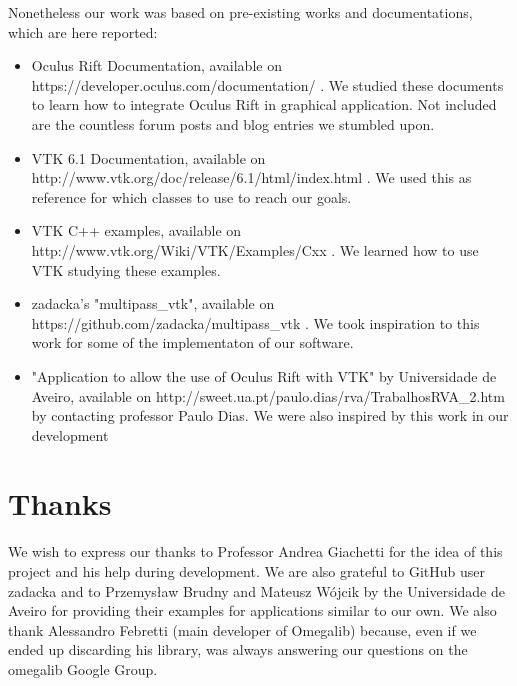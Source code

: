 \documentclass[11pt]{article} %
\begin{document}
Nonetheless our work was based on pre-existing works and documentations, which are here reported:
\begin{itemize}
\item Oculus Rift Documentation, available on https://developer.oculus.com/documentation/ . We studied these documents to learn how to integrate Oculus Rift in graphical application. Not included are the countless forum posts and blog entries we stumbled upon.
\item VTK 6.1 Documentation, available on http://www.vtk.org/doc/release/6.1/html/index.html . We used this as reference for which classes to use to reach our goals.
\item VTK C++ examples, available on http://www.vtk.org/Wiki/VTK/Examples/Cxx . We learned how to use VTK studying these examples.
\item zadacka's "multipass\_vtk", available on https://github.com/zadacka/multipass\_vtk . We took inspiration to this work for some of the  implementaton of our software.
\item "Application to allow the use of Oculus Rift with VTK" by Universidade de Aveiro, available on http://sweet.ua.pt/paulo.dias/rva/TrabalhosRVA\_2.htm by contacting professor Paulo Dias. We were also inspired by this work in our development
\end{itemize}

\newpage

\section{Thanks}
We wish to express our thanks to Professor Andrea Giachetti for the idea of this project and his help during development.
We are also grateful to GitHub user zadacka and to Przemysław Brudny and Mateusz Wójcik by the Universidade de Aveiro for providing their examples for applications similar to our own.
We also thank Alessandro Febretti (main developer of Omegalib) because, even if we ended up discarding his library, was always answering our questions on the omegalib Google Group.
\end{document}
